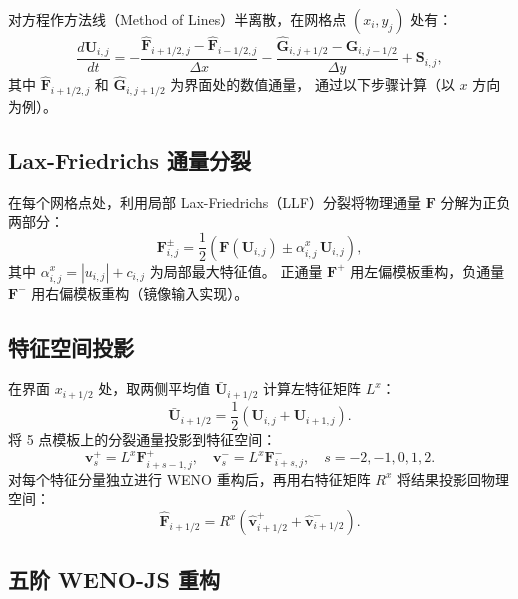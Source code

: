 \documentclass{article}
\numberwithin{equation}{section}
\begin{document}
对方程作方法线（Method of Lines）半离散，在网格点 $(x_i, y_j)$ 处有：
\begin{equation}
    \frac{d \mathbf{U}_{i,j}}{d t} = -\frac{\hat{\mathbf{F}}_{i+1/2,j} - \hat{\mathbf{F}}_{i-1/2,j}}{\Delta x}
    - \frac{\hat{\mathbf{G}}_{i,j+1/2} - \hat{\mathbf{G}}_{i,j-1/2}}{\Delta y} + \mathbf{S}_{i,j},
\end{equation}
其中 $\hat{\mathbf{F}}_{i+1/2,j}$ 和 $\hat{\mathbf{G}}_{i,j+1/2}$ 为界面处的数值通量，
通过以下步骤计算（以 $x$ 方向为例）。

\subsection{Lax-Friedrichs 通量分裂}

在每个网格点处，利用局部 Lax-Friedrichs（LLF）分裂将物理通量 $\mathbf{F}$ 分解为正负两部分：
\begin{equation}
    \mathbf{F}^\pm_{i,j} = \frac{1}{2}\left(\mathbf{F}(\mathbf{U}_{i,j}) \pm \alpha^x_{i,j} \, \mathbf{U}_{i,j}\right),
\end{equation}
其中 $\alpha^x_{i,j} = |u_{i,j}| + c_{i,j}$ 为局部最大特征值。
正通量 $\mathbf{F}^+$ 用左偏模板重构，负通量 $\mathbf{F}^-$ 用右偏模板重构（镜像输入实现）。

\subsection{特征空间投影}

在界面 $x_{i+1/2}$ 处，取两侧平均值 $\bar{\mathbf{U}}_{i+1/2}$ 计算左特征矩阵 $L^x$：
\begin{equation}
    \bar{\mathbf{U}}_{i+1/2} = \frac{1}{2}\left(\mathbf{U}_{i,j} + \mathbf{U}_{i+1,j}\right).
\end{equation}
将 5 点模板上的分裂通量投影到特征空间：
\begin{equation}
    \mathbf{v}^+_s = L^x \mathbf{F}^+_{i+s-1,j},\quad
    \mathbf{v}^-_s = L^x \mathbf{F}^-_{i+s,j},\quad s = -2,-1,0,1,2.
\end{equation}
对每个特征分量独立进行 WENO 重构后，再用右特征矩阵 $R^x$ 将结果投影回物理空间：
\begin{equation}
    \hat{\mathbf{F}}_{i+1/2} = R^x \left(\hat{\mathbf{v}}^+_{i+1/2} + \hat{\mathbf{v}}^-_{i+1/2}\right).
\end{equation}

\subsection{五阶 WENO-JS 重构}
\end{document}

